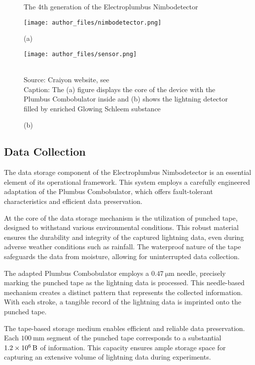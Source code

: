 \documentclass[english]{cenarticle} %
\begin{document}
\begin{figure}[!h]
  \newcommand\x{0.25}
  \caption{The 4th generation of the Electroplumbus Nimbodetector}
    \begin{minipage}[t]{\x\linewidth}
      \texttt{[image: author\_files/nimbodetector.png]}	
      \captionsetup{justification=centering, font=footnotesize}
      \caption*{(a)}\label{fig:triangle2a}
    \end{minipage}
    \begin{minipage}[t]{\x\linewidth}
      \texttt{[image: author\_files/sensor.png]}	
      \captionsetup{justification=centering, font=footnotesize}
      \caption*{(b)}\label{fig:triangle2b}
    \end{minipage}\\
  {\footnotesize
  Source: Craiyon website, see \citep{Craiyon}\\
  Caption: The (a) figure displays the core of the device with the Plumbus Combobulator inside and (b) shows the lightning detector filled by enriched Glowing Schleem substance\\
  }
  \label{fig:electroplumbus}
  \end{figure}\vspace{-10mm}
%
\subsection{Data Collection}
%
The data storage component of the Electroplumbus Nimbodetector is an essential element of its operational framework. This system employs a carefully engineered adaptation of the Plumbus Combobulator, which offers fault-tolerant characteristics and efficient data preservation.\par
%
At the core of the data storage mechanism is the utilization of punched tape, designed to withstand various environmental conditions. This robust material ensures the durability and integrity of the captured lightning data, even during adverse weather conditions such as rainfall. The waterproof nature of the tape safeguards the data from moisture, allowing for uninterrupted data collection.\par
%
The adapted Plumbus Combobulator employs a $\SI{0.47}{\micro\meter}$ needle, precisely marking the punched tape as the lightning data is processed. This needle-based mechanism creates a distinct pattern that represents the collected information. With each stroke, a tangible record of the lightning data is imprinted onto the punched tape.\par
%
The tape-based storage medium enables efficient and reliable data preservation. Each $\SI{100}{\milli\meter}$ segment of the punched tape corresponds to a substantial $\SI{1.2E6}{\byte}$ of information. This capacity ensures ample storage space for capturing an extensive volume of lightning data during experiments.\par
%
\end{document}
